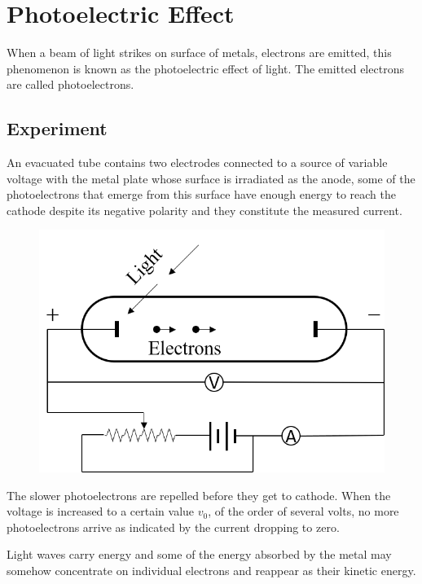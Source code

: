 \documentclass[../main.tex]{subfiles}
\begin{document}
    \chapter{Photoelectric Effect}
    When a beam of light strikes on surface of metals, electrons are emitted, this phenomenon is known as the photoelectric effect of light. The emitted electrons are called photoelectrons.
    \section{Experiment}
    An evacuated tube contains two electrodes connected to a source of variable voltage with the metal plate whose surface is irradiated as the anode, some of the photoelectrons that emerge from this surface have enough energy to reach the cathode despite its negative polarity and they constitute the measured current.
    \begin{figure}[ht]
        \centering
        \includegraphics[scale=1]{photoelectric-experiment.png}
    \end{figure}
    The slower photoelectrons are repelled before they get to cathode. When the voltage is increased to a certain value $ v_0 $, of the order of several volts, no more photoelectrons arrive as indicated by the current dropping to zero.

    Light waves carry energy and some of the energy absorbed by the metal may somehow concentrate on individual electrons and reappear as their kinetic energy.

    \noindent{}
\end{document}

